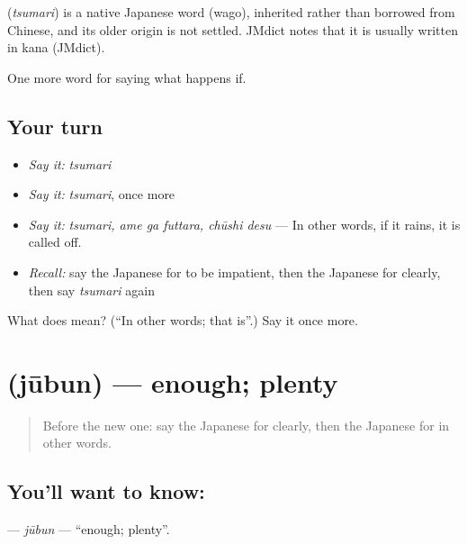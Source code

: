 \begin{cousinweb}
\textbf{} (\emph{tsumari}) is a native Japanese word (wago), inherited rather than borrowed from Chinese, and its older origin is not settled. JMdict notes that it is usually written in kana (JMdict).
\end{cousinweb}

\begin{grammarlens}[title={What you've built}]
One more word for saying what happens if.
\end{grammarlens}

\subsection*{Your turn}
\begin{itemize}
\raggedright
  \item \emph{Say it:} \emph{tsumari}
  \item \emph{Say it:} \emph{tsumari}, once more
  \item \emph{Say it:} \emph{tsumari, ame ga futtara, chūshi desu} — In other words, if it rains, it is called off.
  \item \emph{Recall:} say the Japanese for to be impatient, then the Japanese for clearly, then say \emph{tsumari} again
\end{itemize}

\begin{tcolorbox}[breakable,colback=teal!4,colframe=teal!35!black,title={Before you move on}]
What does  mean? (\textquotedblleft{}In other words; that is\textquotedblright{}.) Say it once more.
\end{tcolorbox}
\section[\texorpdfstring{\ja{じゅうぶん} (jūbun)}{じゅうぶん (jūbun)}]{ (jūbun) — enough; plenty}

\label{lesson:JA-C367-juubun}



\begin{quote}
Before the new one: say the Japanese for clearly, then the Japanese for in other words.
\end{quote}

\subsection*{You'll want to know: }
\textbf{} — \emph{jūbun} — \textquotedblleft{}enough; plenty\textquotedblright{}.


